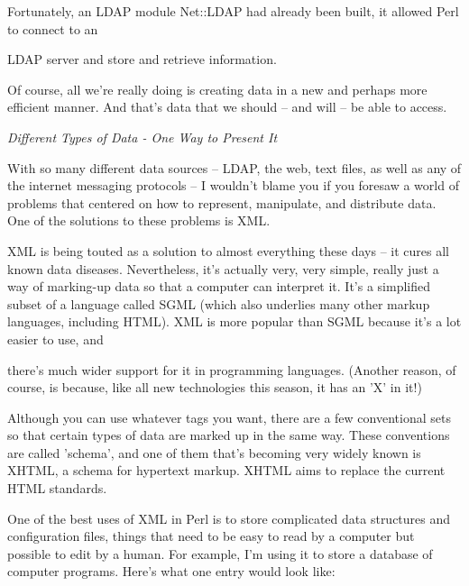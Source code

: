 \documentclass[a4paper,11pt]{book}
\begin{document}
\noindent 

\noindent 

\noindent Fortunately, an LDAP module Net::LDAP had already been built, it allowed Perl to connect to an

\noindent LDAP server and store and retrieve information.

\noindent 

\noindent Of course, all we're really doing is creating data in a new and perhaps more efficient manner. And that's data that we should -- and will -- be able to access.

\noindent 

\noindent \textit{Different Types of Data - One Way to Present It}

\noindent With so many different data sources -- LDAP, the web, text files, as well as any of the internet messaging protocols -- I wouldn't blame you if you foresaw a world of problems that centered on how to represent, manipulate, and distribute data. One of the solutions to these problems is XML.

\noindent 

\noindent XML is being touted as a solution to almost everything these days -- it cures all known data diseases. Nevertheless, it's actually very, very simple, really just a way of marking-up data so that a computer can interpret it. It's a simplified subset of a language called SGML (which also underlies many other markup languages, including HTML). XML is more popular than SGML because it's a lot easier to use, and

\noindent there's much wider support for it in programming languages. (Another reason, of course, is because, like all new technologies this season, it has an 'X' in it!)

\noindent 

\noindent Although you can use whatever tags you want, there are a few conventional sets so that certain types of data are marked up in the same way. These conventions are called 'schema', and one of them that's becoming very widely known is XHTML, a schema for hypertext markup. XHTML aims to replace the current HTML standards.

\noindent 

\noindent One of the best uses of XML in Perl is to store complicated data structures and configuration files, things that need to be easy to read by a computer but possible to edit by a human. For example, I'm using it to store a database of computer programs. Here's what one entry would look like:
\end{document}
